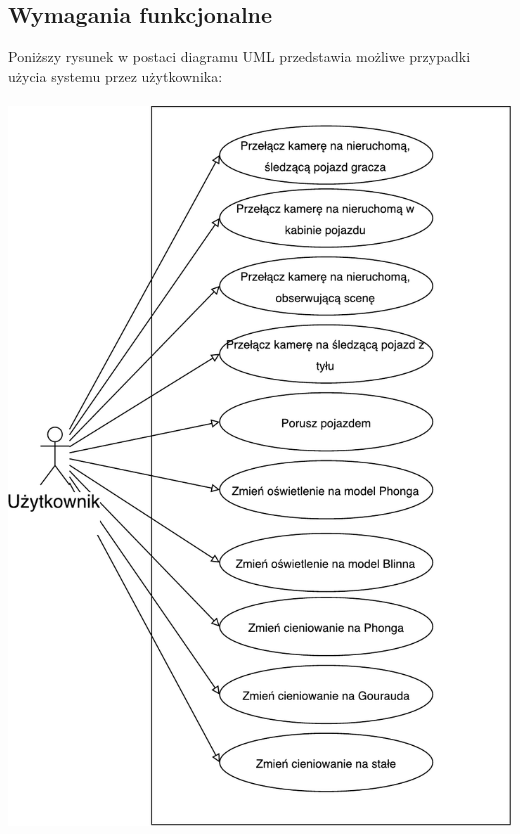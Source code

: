 \documentclass[11pt]{article}
\let\Oldsubsection\subsection
\renewcommand{\subsection}{\FloatBarrier\Oldsubsection}
\begin{document}
\subsection{Wymagania funkcjonalne}
Poniższy rysunek w postaci diagramu UML przedstawia możliwe przypadki użycia systemu przez użytkownika:
\\
\\
\includegraphics[scale=0.5]{use_case_pdf}
\end{document}
